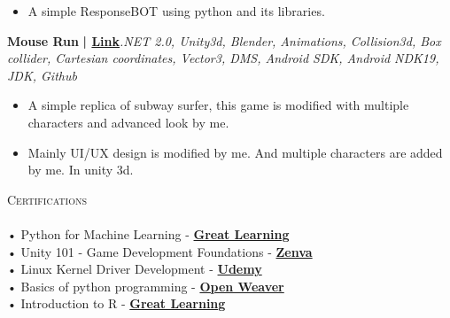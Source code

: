 \documentclass[a4paper]{article}
\newcommand{\lineunder} {
    \vspace*{-8pt} \\
    \hspace*{-18pt} \hrulefill \\
}
\newcommand{\header} [1] {
    {\hspace*{-18pt}\vspace*{6pt} \textsc{#1}}
    \vspace*{-6pt} \lineunder
}
\begin{document}
          \vspace{-3mm}
\begin{itemize} \itemsep -3pt
\item[] A simple ResponseBOT using python and its libraries.
\end{itemize}
          \vspace*{3mm}
      {\textbf{Mouse Run}}\textbf{ | \href{https://drive.google.com/file/d/1EAnTfjY9stPdBAms3a9Z3xEnkkcyWy7z/view?usp=share\_link}{Link}}\hfill{\sl .NET 2.0, Unity3d, Blender, Animations, Collision3d, Box collider, Cartesian coordinates, Vector3, DMS, Android SDK, Android NDK19, JDK, Github}\\
          \vspace{-3mm}
\begin{itemize} \itemsep -3pt
\item[] A simple replica of subway surfer, this game is modified with multiple characters and advanced look by me.
\item[] Mainly UI/UX design is modified by me. And multiple characters are added by me. In unity 3d.
\end{itemize}
          \vspace*{3mm}

      \header{Certifications}
      \vspace{2mm}
      • Python for Machine Learning - \textbf{\href{http://verify.greatlearning.in/YCJZRFXF}{Great Learning}}\\
\vspace*{1mm}
      • Unity 101 - Game Development Foundations - \textbf{\href{https://academy.zenva.com/certificate/43c75b4090f0}{Zenva}}\\
\vspace*{1mm}
      • Linux Kernel Driver Development - \textbf{\href{https://www.udemy.com/certificate/UC-3422b92d-d6a8-49cc-9ad6-74bcdfed38f6/}{Udemy}}\\
\vspace*{1mm}
      • Basics of python programming - \textbf{\href{https://certificates.openweaver.com/en/verify/36763849170015}{Open Weaver}}\\
\vspace*{1mm}
      • Introduction to R - \textbf{\href{https://verify.mygreatlearning.com/verify/LEODPFME}{Great Learning}}\\
\vspace*{1mm}
      \vspace{2mm}



    \ 
    
\end{document}
